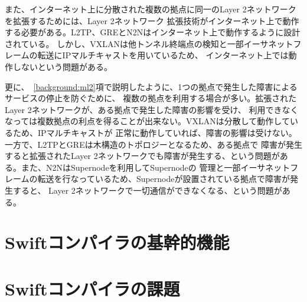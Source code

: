 また、インターネット上に分散された複数の拠点に同一のLayer 2ネットワークを拡張するためには、Layer 2ネットワーク
拡張技術がインターネット上で動作する必要がある。L2TP、GREとN2Nはインターネット上で動作するように設計されている。
しかし、VXLANは他トンネル終端点の検知と一部イーサネットフレームの転送にIPマルチキャストを用いているため、
インターネット上では動作しないという問題がある。

更に、~\ref{background:ml2}項で説明したように、1つの拠点で発生した障害によるサービスの停止を防ぐために、
複数の拠点を利用する場合が多い。拡張されたLayer 2ネットワークが、ある拠点で発生した障害の影響を受け、
利用できなくなっては複数拠点の利点を得ることが出来ない。VXLANは分散して動作しているため、IPマルチキャストが
正常に動作していれば、障害の影響は受けない。一方で、L2TPとGREは木構造のトポロジーとなるため、ある拠点で
障害が発生すると拡張されたLayer 2ネットワークでも障害が発生する、という問題がある。また、N2NはSupernodeを利用してSupernodeの
管理と一部イーサネットフレームの転送を行なっているため、Supernodeが設置されている拠点で障害が発生すると、
Layer 2ネットワークで一切通信ができなくなる、という問題がある。

\section{Swiftコンパイラの基幹的機能}

\section{Swiftコンパイラの課題}

